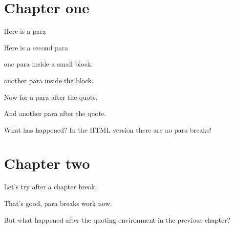 \documentclass{scrbook}
\begin{document}
\chapter{Chapter one}
Here is a para

Here is a second para

\begin{quoting}
one para inside a small block.

another para inside the block.
\end{quoting}

Now for a para after the quote.

And another para after the quote.

What has happened? In the HTML version there are no para breaks!

\chapter{Chapter two}
Let's try after a chapter break.

That's good, para breaks work now.

But what happened after the quoting environment in the previous chapter?
\end{document}
